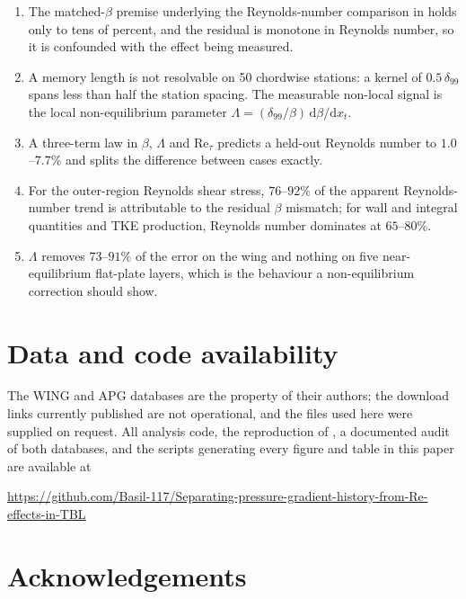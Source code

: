\documentclass[11pt,a4paper]{article}
\newcommand{\Ret}{\mathrm{Re}_\tau}
\newcommand{\dnn}{\delta_{99}}
\begin{document}
\begin{enumerate}
  \item The matched-$\beta$ premise underlying the Reynolds-number
        comparison in \citet{vinuesa2018} holds only to tens of percent, and
        the residual is monotone in Reynolds number, so it is confounded
        with the effect being measured.
  \item A memory length is not resolvable on 50 chordwise stations: a kernel
        of $0.5\,\dnn$ spans less than half the station spacing. The
        measurable non-local signal is the local non-equilibrium parameter
        $\Lambda = (\dnn/\beta)\,\mathrm{d}\beta/\mathrm{d}x_t$.
  \item A three-term law in $\beta$, $\Lambda$ and $\Ret$ predicts a
        held-out Reynolds number to $1.0$--$7.7\%$ and splits the difference
        between cases exactly.
  \item For the outer-region Reynolds shear stress, $76$--$92\%$ of the
        apparent Reynolds-number trend is attributable to the residual
        $\beta$ mismatch; for wall and integral quantities and TKE
        production, Reynolds number dominates at $65$--$80\%$.
  \item $\Lambda$ removes $73$--$91\%$ of the error on the wing and nothing
        on five near-equilibrium flat-plate layers, which is the behaviour a
        non-equilibrium correction should show.
\end{enumerate}

\section*{Data and code availability}

The WING and APG databases are the property of their authors; the download
links currently published are not operational, and the files used here were
supplied on request. All analysis code, the reproduction of
\citet{vinuesa2018}, a documented audit of both databases, and the scripts
generating every figure and table in this paper are available at
\begin{center}
\footnotesize
\url{https://github.com/Basil-117/Separating-pressure-gradient-history-from-Re-effects-in-TBL}
\end{center}

\section*{Acknowledgements}
\end{document}

